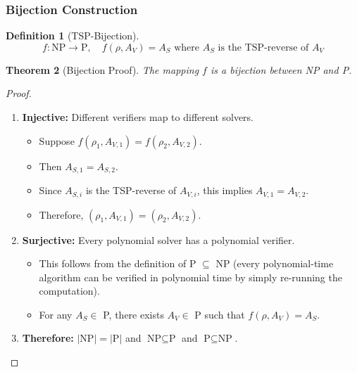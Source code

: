 \documentclass[11pt, letterpaper]{article}
\newtheorem{theorem}{Theorem}[section]
\newtheorem{definition}[theorem]{Definition}
\begin{document}
\subsubsection{Bijection Construction}

\begin{definition}[TSP-Bijection]
\begin{equation}
f: \text{NP} \rightarrow \text{P}, \quad f(\rho, A_V) = A_S \text{ where } A_S \text{ is the TSP-reverse of } A_V
\end{equation}
\end{definition}

\begin{theorem}[Bijection Proof]
The mapping $f$ is a bijection between NP and P.
\end{theorem}

\begin{proof}
\begin{enumerate}
    \item \textbf{Injective:} Different verifiers map to different solvers.
    \begin{itemize}
        \item Suppose $f(\rho_1, A_{V,1}) = f(\rho_2, A_{V,2})$.
        \item Then $A_{S,1} = A_{S,2}$.
        \item Since $A_{S,i}$ is the TSP-reverse of $A_{V,i}$, this implies $A_{V,1} = A_{V,2}$.
        \item Therefore, $(\rho_1, A_{V,1}) = (\rho_2, A_{V,2})$.
    \end{itemize}
    
    \item \textbf{Surjective:} Every polynomial solver has a polynomial verifier.
    \begin{itemize}
        \item This follows from the definition of P $\subseteq$ NP (every polynomial-time algorithm can be verified in polynomial time by simply re-running the computation).
        \item For any $A_S \in$ P, there exists $A_V \in$ P such that $f(\rho, A_V) = A_S$.
    \end{itemize}
    
    \item \textbf{Therefore:} $|\text{NP}| = |\text{P}|$ and $\text{NP} \subseteq \text{P}$ and $\text{P} \subseteq \text{NP}$.
\end{enumerate}
\end{proof}
\end{document}
